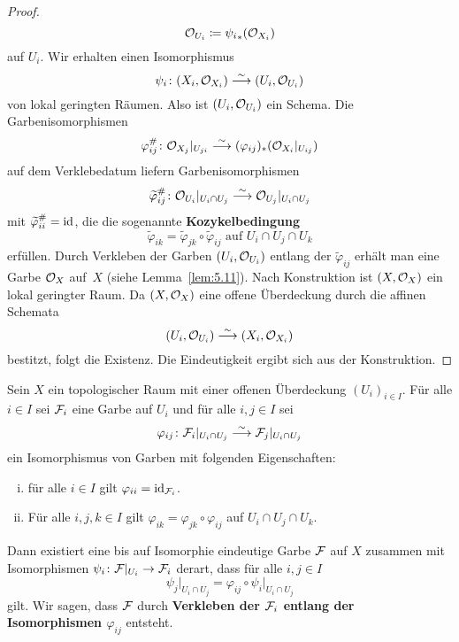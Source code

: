 \begin{lem}
\begin{proof}
		\[
			\mathcal{O}_{U_i} \coloneqq {\psi_i}_*(\mathcal{O}_{X_i})
		\]
		auf $U_i$. Wir erhalten einen Isomorphismus
		\[
			\psi_i\colon(X_i,\mathcal{O}_{X_i})\overset{\sim}{\longrightarrow} (U_i,\mathcal{O}_{U_i})	
		\]
		von lokal geringten Räumen. Also ist $(U_i,\mathcal{O}_{U_i})$ ein Schema. Die Garbenisomorphismen
		\[
			\varphi^{\#}_{ij}\colon \mathcal{O}_{X_j}\vert_{U_{ji}} \overset{\sim}{\longrightarrow} (\varphi_{ij})_*(\mathcal{O}_{X_i}\vert_{U_{ij}})
		\]
		auf dem Verklebedatum liefern Garbenisomorphismen 
		\[
			\widetilde{\varphi}^{\#}_{ij}\colon \mathcal{O}_{U_i}\vert_{U_i \cap U_j} \overset{\sim}{\longrightarrow} \mathcal{O}_{U_j}\vert_{U_i \cap U_j}
		\]
		mit $\widetilde{\varphi}^{\#}_{ii} = \operatorname{id}$, die die sogenannte \textbf{Kozykelbedingung}
		\[
			\widetilde{\varphi}_{ik} = \widetilde{\varphi}_{jk} \circ \widetilde{\varphi}_{ij} \text{ auf } U_i \cap U_j \cap U_k
		\]
		erfüllen. Durch Verkleben der Garben $(U_i,\mathcal{O}_{U_i})$ entlang der $\widetilde{\varphi}_{ij}$ erhält man eine Garbe $\mathcal{O}_X$ auf~$X$ (siehe Lemma~\ref{lem:5.11}). Nach Konstruktion ist $(X,\mathcal{O}_X)$ ein lokal geringter Raum. Da $(X,\mathcal{O}_X)$ eine offene Überdeckung durch die affinen Schemata
		\[
			(U_i,\mathcal{O}_{U_i}) \overset{\sim}{\longrightarrow} (X_i, \mathcal{O}_{X_i})
		\]
		bestitzt, folgt die Existenz. Die Eindeutigkeit ergibt sich aus der Konstruktion.
	\end{proof}
\end{lem}

\begin{lem}
\label{lem:5.11}
	Sein $X$ ein topologischer Raum mit einer offenen Überdeckung $(U_i)_{i\in I}$. Für alle $i \in I$ sei $\mathcal{F}_i$ eine Garbe auf $U_i$ und für alle $i,j \in I$ sei
	\[
		\varphi_{ij}\colon \mathcal{F}_i\vert_{U_i\cap U_j} \overset{\sim}{\longrightarrow} \mathcal{F}_j\vert_{U_i\cap U_j}
	\]
	ein Isomorphismus von Garben mit folgenden Eigenschaften:
	\begin{enumerate}[i)]
		\item für alle $i \in I$ gilt $\varphi_{ii} = \operatorname{id}_{\mathcal{F}_i}$.
		\item Für alle $i,j,k \in I$ gilt $\varphi_{ik} = \varphi_{jk} \circ \varphi_{ij}$ auf $U_i \cap U_j \cap U_k$.
	\end{enumerate}
	Dann existiert eine bis auf Isomorphie eindeutige Garbe $\mathcal{F}$ auf $X$ zusammen mit Isomorphismen $\psi_i \colon \mathcal{F}\vert_{U_i} \to \mathcal{F}_i$ derart, dass für alle $i,j \in I$
	\[
                \psi_j\vert_{U_i \cap U_j} = \varphi_{ij} \circ \psi_i\vert_{U_i\cap U_j}
	\]
	gilt. Wir sagen, dass $\mathcal{F}$ durch \textbf{Verkleben der $\mathcal{F}_i$ entlang der Isomorphismen $\varphi_{ij}$} entsteht.
\end{lem}


